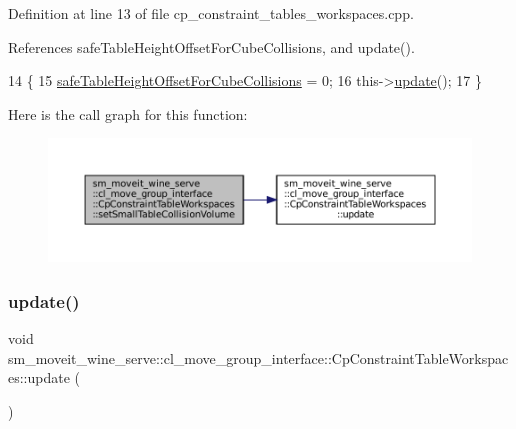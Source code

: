 Definition at line 13 of file cp\+\_\+constraint\+\_\+tables\+\_\+workspaces.\+cpp.



References safe\+Table\+Height\+Offset\+For\+Cube\+Collisions, and update().


\begin{DoxyCode}
14         \{
15             \hyperlink{classsm__moveit__wine__serve_1_1cl__move__group__interface_1_1CpConstraintTableWorkspaces_a5233fcac3ab6ce00f9e1c6e950462e58}{safeTableHeightOffsetForCubeCollisions} = 0;
16             this->\hyperlink{classsm__moveit__wine__serve_1_1cl__move__group__interface_1_1CpConstraintTableWorkspaces_af14a8a8c61b0dcfa6b062ba8493d5a5d}{update}();
17         \}
\end{DoxyCode}
Here is the call graph for this function\+:
\nopagebreak
\begin{figure}[H]
\begin{center}
\leavevmode
\includegraphics[width=350pt]{classsm__moveit__wine__serve_1_1cl__move__group__interface_1_1CpConstraintTableWorkspaces_ab059b21be65d4b79c14d73483e9ebfc6_cgraph}
\end{center}
\end{figure}
\mbox{\label{classsm__moveit__wine__serve_1_1cl__move__group__interface_1_1CpConstraintTableWorkspaces_af14a8a8c61b0dcfa6b062ba8493d5a5d}} 
\subsubsection{\texorpdfstring{update()}{update()}}
{\footnotesize\ttfamily void sm\+\_\+moveit\+\_\+wine\+\_\+serve\+::cl\+\_\+move\+\_\+group\+\_\+interface\+::\+Cp\+Constraint\+Table\+Workspaces\+::update (\begin{DoxyParamCaption}{ }\end{DoxyParamCaption})\hspace{0.3cm}{\ttfamily [virtual]}}



